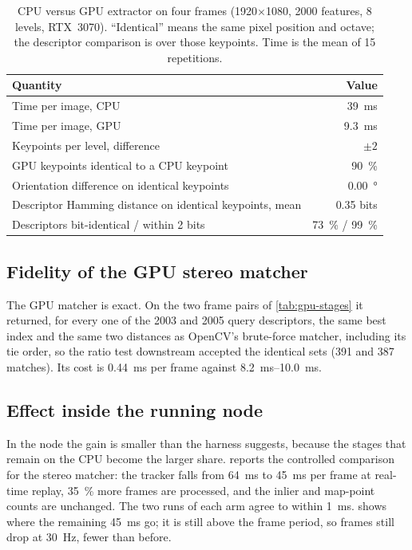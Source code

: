 \documentclass[11pt,a4paper,notitlepage]{report}
\begin{document}
\begin{table}[htbp]
\centering
\caption{CPU versus GPU extractor on four  frames
(\num{1920}\(\times\)\num{1080}, \num{2000} features, 8 levels, RTX~3070).
``Identical'' means the same pixel position and octave; the descriptor
comparison is over those keypoints. Time is the mean of 15 repetitions.}
\label{tab:gpu-fidelity}
\small
\begin{tabular}{lr}
\toprule
Quantity & Value \\
\midrule
Time per image, CPU & \SI{39}{\milli\second} \\
Time per image, GPU & \SI{9.3}{\milli\second} \\
Keypoints per level, difference & \(\pm 2\) \\
GPU keypoints identical to a CPU keypoint & \SI{90}{\percent} \\
Orientation difference on identical keypoints & \SI{0.00}{\degree} \\
Descriptor Hamming distance on identical keypoints, mean & \num{0.35} bits \\
Descriptors bit-identical / within 2 bits & \SI{73}{\percent} / \SI{99}{\percent} \\
\bottomrule
\end{tabular}
\end{table}

\subsection{Fidelity of the GPU stereo matcher}

The GPU matcher is exact. On the two frame pairs of \cref{tab:gpu-stages} it
returned, for every one of the \num{2003} and \num{2005} query descriptors,
the same best index and the same two distances as OpenCV's brute-force
matcher, including its tie order, so the ratio test downstream accepted the
identical sets (\num{391} and \num{387} matches). Its cost is
\SI{0.44}{\milli\second} per frame against \SIrange{8.2}{10.0}{\milli\second}.

\subsection{Effect inside the running node}
\label{sec:gpu-node}

In the node the gain is smaller than the harness suggests, because the
stages that remain on the CPU become the larger share. 
reports the controlled comparison for the stereo matcher: the tracker falls
from \SI{64}{\milli\second} to \SI{45}{\milli\second} per frame at real-time
replay, \SI{35}{\percent} more frames are processed, and the inlier and
map-point counts are unchanged. The two runs of each arm agree to within
\SI{1}{\milli\second}.  shows where the remaining
\SI{45}{\milli\second} go; it is still above the frame period, so frames
still drop at \SI{30}{\hertz}, fewer than before.
\end{document}
